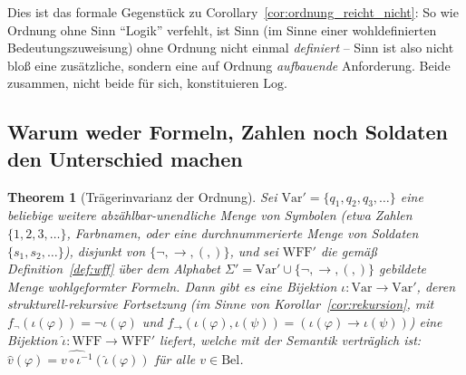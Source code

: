 \documentclass[12pt, a4paper]{article}
\newtheorem{theorem}{Theorem}[section]
\theoremstyle{definition}
\theoremstyle{remark}
\newcommand{\WFF}{\mathrm{WFF}}
\newcommand{\Var}{\mathrm{Var}}
\newcommand{\Log}{\mathrm{Log}}
\newcommand{\Bel}{\mathrm{Bel}}
\begin{document}
Dies ist das formale Gegenstück zu Corollary~\ref{cor:ordnung_reicht_nicht}: So wie Ordnung ohne Sinn ``Logik'' verfehlt, ist Sinn (im Sinne einer wohldefinierten Bedeutungszuweisung) ohne Ordnung nicht einmal \emph{definiert} -- Sinn ist also nicht bloß eine zusätzliche, sondern eine auf Ordnung \emph{aufbauende} Anforderung. Beide zusammen, nicht beide für sich, konstituieren $\Log$.

\subsection{Warum weder Formeln, Zahlen noch Soldaten den Unterschied machen}
\label{subsec:isomorphie}

\begin{theorem}[Trägerinvarianz der Ordnung]
\label{thm:isomorphie}
Sei $\Var' = \{q_1, q_2, q_3, \dots\}$ eine beliebige weitere abzählbar-unendliche Menge von Symbolen (etwa Zahlen $\{1,2,3,\dots\}$, Farbnamen, oder eine durchnummerierte Menge von Soldaten $\{s_1,s_2,\dots\}$), disjunkt von $\{\neg,\to,(,)\}$, und sei $\WFF'$ die gemäß Definition~\ref{def:wff} über dem Alphabet $\Sigma' = \Var' \cup \{\neg,\to,(,)\}$ gebildete Menge wohlgeformter Formeln. Dann gibt es eine Bijektion $\iota: \Var \to \Var'$, deren strukturell-rekursive Fortsetzung (im Sinne von Korollar~\ref{cor:rekursion}, mit $f_\neg(\iota(\varphi)) = \neg\iota(\varphi)$ und $f_\to(\iota(\varphi),\iota(\psi)) = (\iota(\varphi)\to\iota(\psi))$) eine Bijektion $\hat\iota : \WFF \to \WFF'$ liefert, welche mit der Semantik verträglich ist: $\hat v(\varphi) = \widehat{v\circ\iota^{-1}}(\hat\iota(\varphi))$ für alle $v \in \Bel$.
\end{theorem}
\end{document}
